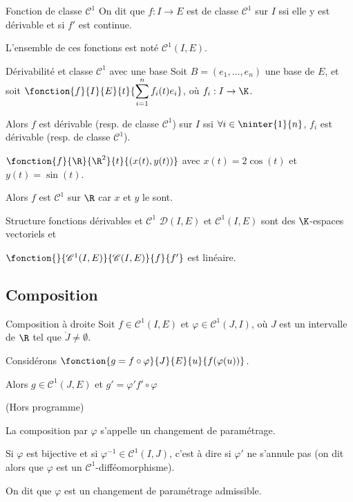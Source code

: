\begin{definition}{Fonction de classe $\mathscr C^1$}{}
    On dit que $f : I \to E$ est de classe $\mathscr C^1$ sur $I$ ssi 
    elle y est dérivable et si $f'$ est continue. 

    L'ensemble de ces fonctions est noté $\mathscr C^1(I, E)$.
\end{definition}

\begin{proposition}{Dérivabilité et classe $\mathscr C^1$ avec une base }{}
    Soit $B = (e_1, \ldots, e_n)$ une base de $E$, et soit
    $\displaystyle \fonction{f}{I}{E}{t}{\sum_{i=1}^n f_i(t)e_i}$, où $f_i : I \to \K$.

    Alors $f$ est dérivable (resp. de classe $\mathscr C^1$) sur $I$ ssi
    $\forall i \in \ninter{1}{n}$, $f_i$ est dérivable (resp. de classe $\mathscr C^1$).
\end{proposition}

\begin{exemple}
    $\fonction{f}{\R}{\R^2}{t}{(x(t), y(t))}$ avec $x(t) = 2 \cos(t)$ et $y(t) = \sin(t)$.

    Alors $f$ est $\mathscr C^1$ sur $\R$ car $x$ et $y$ le sont.
\end{exemple}

\begin{proposition}{Structure fonctions dérivables et $\mathscr C^1$}{}
    $\mathscr D(I, E)$ et $\mathscr C^1(I, E)$ sont des $\K$-espaces vectoriels et 

    $\fonction{}{\mathscr C^1(I, E)}{\mathscr C(I, E)}{f}{f'}$ est linéaire. 
\end{proposition}

\subsection{Composition }

\begin{proposition}{Composition à droite}{}
    Soit $f \in \mathscr C^1(I, E)$ et $\varphi \in \mathscr C^1(J, I)$, où $J$ est un intervalle de $\R$
    tel que $\mathring{J } \neq \emptyset$. 

    Considérons $\fonction{g = f \circ \varphi}{J}{E}{u}{f(\varphi(u))}$.

    Alors $g \in \mathscr C^1(J, E)$ et $g' = \varphi' f' \circ \varphi$
    
\end{proposition}

\begin{remarque}
    (Hors programme)

    La composition par $\varphi$ s'appelle un changement de paramétrage.

    Si $\varphi$ est bijective et si $\varphi^{-1} \in \mathscr C^1(I, J)$, c'est à dire si 
    $\varphi '$ ne s'annule pas (on dit alors que $\varphi$ est un $\mathscr C^1$-difféomorphisme). 

    On dit que $\varphi$ est un changement de paramétrage admissible.
\end{remarque}

